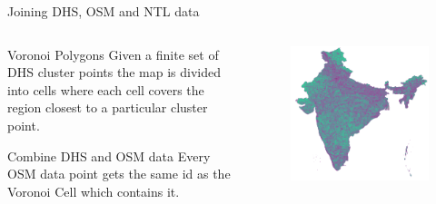 \documentclass[t]{beamer}
\begin{document}
\begin{frame}{Joining DHS, OSM and NTL data}
	\begin{columns}[T,totalwidth=\textwidth]
        \begin{column}{0.45\textwidth}
	        \begin{block}{Voronoi Polygons}
	        Given a finite set of DHS cluster points the map is divided into cells where each cell covers the region closest to a particular cluster point.
	        \end{block}
	        \begin{block}{Combine DHS and OSM data}
	        Every OSM data point gets the same id as the Voronoi Cell which contains it.
	        \end{block}
	    \end{column}
	    
	    \begin{column}{0.45\textwidth}
			\begin{figure}
				\vspace{-\blocktitlesize}
				\includegraphics[height=0.65\paperheight,keepaspectratio]{images/india-voronoi.png}
			\end{figure}
  		\end{column}
  	\end{columns}
\end{frame}
\end{document}
